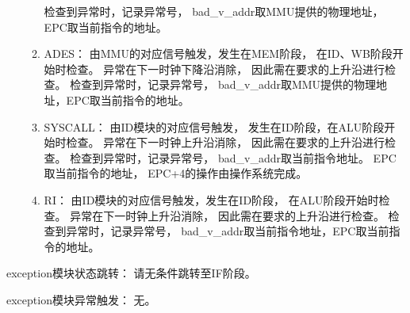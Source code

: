\begin{enumerate}
\begin{enumerate}
                        检查到异常时，记录异常号，%
                        bad\_v\_addr取MMU提供的物理地址，EPC取当前指令的地址。
                    \item
                    ADES：
                        由MMU的对应信号触发，发生在MEM阶段，%
                        在ID、WB阶段开始时检查。%
                        异常在下一时钟下降沿消除，%
                        因此需在要求的上升沿进行检查。%
                        检查到异常时，记录异常号，%
                        bad\_v\_addr取MMU提供的物理地址，EPC取当前指令的地址。
                    \item
                    SYSCALL：
                        由ID模块的对应信号触发，%
                        发生在ID阶段，在ALU阶段开始时检查。%
                        异常在下一时钟上升沿消除，%
                        因此需在要求的上升沿进行检查。%
                        检查到异常时，记录异常号，%
                        bad\_v\_addr取当前指令地址。%
                        EPC取当前指令的地址，%
                        EPC+4的操作由操作系统完成。
                    \item
                    RI：
                        由ID模块的对应信号触发，发生在ID阶段，%
                        在ALU阶段开始时检查。%
                        异常在下一时钟上升沿消除，%
                        因此需在要求的上升沿进行检查。%
                        检查到异常时，记录异常号，%
                        bad\_v\_addr取当前指令地址，EPC取当前指令的地址。
                \end{enumerate}
                \end{enumerate}

                exception模块状态跳转：
                    请无条件跳转至IF阶段。

                exception模块异常触发：
                    无。
